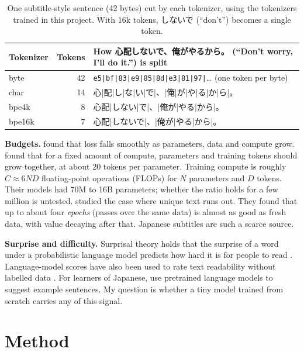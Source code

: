 \documentclass[11pt]{article}
\begin{document}
\begin{table}[H]
\centering\small
\begin{tabular}{lrl}
\toprule
Tokenizer & Tokens & How 心配しないで、俺がやるから。 (``Don't worry, I'll do it.'') is split \\
\midrule
byte   & 42 & \texttt{e5|bf|83|e9|85|8d|e3|81|97|}\ldots{} (one token per byte) \\
char   & 14 & 心|配|し|な|い|で|、|俺|が|や|る|か|ら|。 \\
bpe4k  & 8  & 心配|しない|で|、|俺が|やる|から|。 \\
bpe16k & 7  & 心配|しないで|、|俺が|やる|から|。 \\
\bottomrule
\end{tabular}
\caption{One subtitle-style sentence (42 bytes) cut by each tokenizer, using
the tokenizers trained in this project. With 16k tokens, しないで (``don't'')
becomes a single token.}
\label{tab:tokex}
\end{table}

\textbf{Budgets.} \citet{kaplan2020scaling} found that loss falls smoothly as
parameters, data and compute grow. \citet{hoffmann2022chinchilla} found that
for a fixed amount of compute, parameters and training tokens should grow
together, at about 20 tokens per parameter. Training compute is roughly
$C \approx 6ND$ floating-point operations (FLOPs) for $N$ parameters and $D$
tokens. Their models had 70M to 16B parameters; whether the ratio holds for a few
million is untested. \citet{muennighoff2023scaling} studied the case where unique
text runs out. They found that up to about four \emph{epochs} (passes over the
same data) is almost as good as fresh data, with value decaying after that.
Japanese subtitles are such a scarce source.

\textbf{Surprise and difficulty.} Surprisal theory holds that the surprise of a
word under a probabilistic language model predicts how hard it is for people to
read \citep{hale2001probabilistic,levy2008expectation}. Language-model scores
have also been used to rate text readability without labelled data
\citep{martinc2021readability}. For learners of Japanese,
\citet{benedetti2025examples} use pretrained language models to suggest example
sentences. My question is
whether a tiny model trained from scratch carries any of this signal.

\section{Method}
\end{document}
